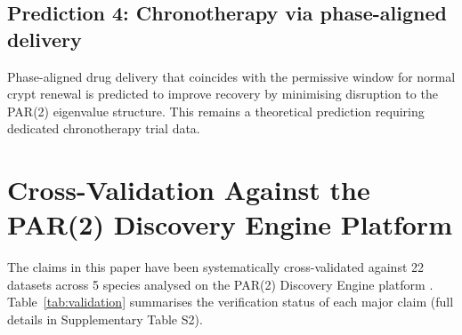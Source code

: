 \documentclass[11pt,letterpaper]{article}
\theoremstyle{definition}
\theoremstyle{remark}
\begin{document}
\subsection{Prediction 4: Chronotherapy via phase-aligned delivery}

Phase-aligned drug delivery that coincides with the permissive window for normal crypt renewal is predicted to improve recovery by minimising disruption to the PAR(2) eigenvalue structure. This remains a theoretical prediction requiring dedicated chronotherapy trial data.

\section{Cross-Validation Against the PAR(2) Discovery Engine Platform}

The claims in this paper have been systematically cross-validated against 22 datasets across 5 species analysed on the PAR(2) Discovery Engine platform \citep{whiteside2026paper_a}. Table~\ref{tab:validation} summarises the verification status of each major claim (full details in Supplementary Table S2).
\end{document}
